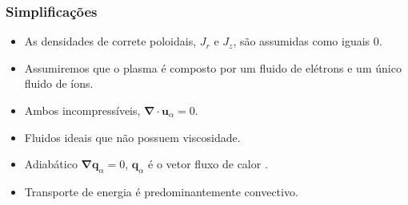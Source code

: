 \documentclass[aspectratio=169]{beamer}
\begin{document}
	\begin{frame}
		\frametitle{Simplificações}
		\begin{itemize}
		\item As densidades de correte poloidais, $J_r$ e $J_z$, são assumidas como iguais 0.
		\item  Assumiremos que o plasma é composto por um fluido de elétrons e um único fluido
de íons. 
		\item Ambos incompressíveis, $\bm{\nabla} \cdot \bm{u}_{\alpha} = 0$.  
		\item Fluidos ideais que não possuem viscosidade. %
		\item Adiabático $\bm{\nabla} \bm{q}_{\alpha} = 0$, $\bm{q}_\alpha$ é o vetor fluxo de calor \cite[pg. 181]{bittencourt}. %
			\item Transporte de energia é predominantemente convectivo. %
				\end{itemize}
		
		\end{frame}	
		
\end{document}
